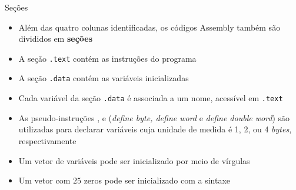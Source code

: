 \begin{frame}[fragile]{Seções}

    \begin{itemize}
        \item Além das quatro colunas identificadas, os códigos Assembly também são divididos
            em \textbf{seções}

        \item A seção \texttt{.text} contém as instruções do programa

        \item A seção \texttt{.data} contém as variáveis inicializadas

        \item Cada variável da seção \texttt{.data} é associada a um nome, acessível em \texttt{.text}

        \item As pseudo-instruções ,  e  
            (\textit{define byte, define word} e \textit{define double word}) são 
            utilizadas para declarar variáveis cuja unidade de medida é 1, 2, ou 4 \textit{bytes},
            respectivamente

        \item Um vetor de variáveis pode ser inicializado por meio de vírgulas


        \item Um vetor com $25$ zeros pode ser inicializado com a sintaxe


    \end{itemize}

\end{frame}


